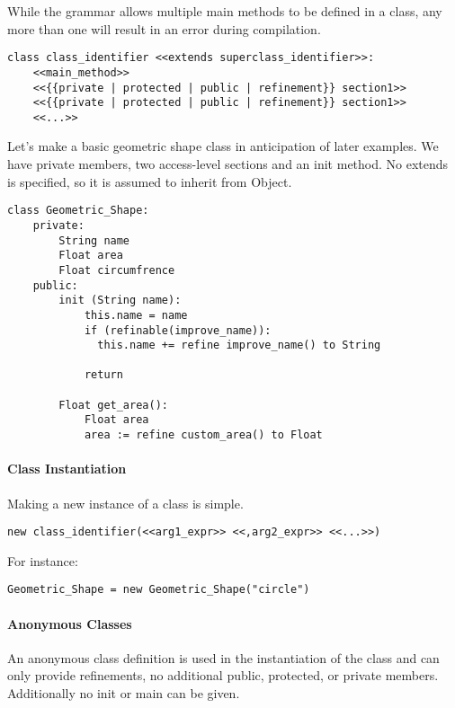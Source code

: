 While the grammar allows multiple main methods to be defined in a class, any more than one will result in an error during compilation.

\begin{lstlisting}
class class_identifier <<extends superclass_identifier>>:
    <<main_method>>
    <<{{private | protected | public | refinement}} section1>>
    <<{{private | protected | public | refinement}} section1>>
    <<...>>
\end{lstlisting}

Let's make a basic geometric shape class in anticipation of later examples. We have private members, two access-level sections and an init method. No extends is specified, so it is assumed to inherit from Object.


\begin{lstlisting}[backgroundcolor=\color{tintedorange},label=Method Invocation,caption=Class Declaration for a Geometric Shape class]
class Geometric_Shape:
    private:
        String name
        Float area
        Float circumfrence
    public:
        init (String name):
            this.name = name
            if (refinable(improve_name)):
              this.name += refine improve_name() to String
            
            return
            
        Float get_area():
            Float area
            area := refine custom_area() to Float
\end{lstlisting}

\paragraph{Class Instantiation}
Making a new instance of a class is simple.

\begin{lstlisting}
new class_identifier(<<arg1_expr>> <<,arg2_expr>> <<...>>)
\end{lstlisting}

For instance:

\begin{lstlisting}[backgroundcolor=\color{tintedorange},label=Method Invocation,caption=Class Instantiation for a Geometric Shape class]
Geometric_Shape = new Geometric_Shape("circle")
\end{lstlisting}

\paragraph{Anonymous Classes}
An anonymous class definition is used in the instantiation of the class and can only provide refinements, no additional public, protected, or private members. Additionally no init or main can be given.

